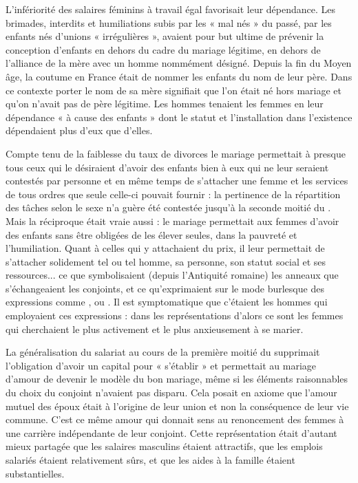 L'infériorité des salaires féminins à travail égal favorisait leur dépendance. Les brimades, interdits et humiliations subis par les « mal nés » du passé, par les enfants nés d'unions « irrégulières »,  avaient pour but ultime de prévenir la conception d'enfants en dehors du cadre du mariage légitime, en dehors de l'alliance de la mère avec un homme nommément désigné. Depuis la fin du Moyen âge, la coutume en France était de nommer les enfants du nom de leur père. Dans ce contexte porter le nom de sa mère signifiait que l'on était né hors mariage et qu'on n'avait pas de père légitime. Les hommes tenaient les femmes en leur dépendance « à cause des enfants » dont le statut et l'installation dans l'existence dépendaient plus d'eux que d'elles. 

Compte tenu de la faiblesse du taux de divorces le mariage permettait à presque tous ceux qui le désiraient d'avoir des enfants bien à eux qui ne leur seraient contestés par personne et en même temps de s'attacher une femme et les services de tous ordres que seule celle-ci pouvait fournir : la pertinence de la répartition des tâches selon le sexe n'a guère été contestée jusqu'à la seconde moitié du . Mais la réciproque était vraie aussi : le mariage permettait aux femmes d'avoir des enfants sans être obligées de les élever seules, dans la pauvreté et l'humiliation. Quant à celles qui y attachaient du prix, il leur permettait de s'attacher solidement tel ou tel homme, sa personne, son statut social et ses ressources... ce que symbolisaient (depuis l'Antiquité romaine) les anneaux que s'échangeaient les conjoints, et ce qu'exprimaient sur le mode burlesque des expressions comme , ou . Il est symptomatique que c'étaient les hommes qui employaient ces expressions : dans les représentations d'alors ce sont les femmes qui cherchaient le plus activement et le plus anxieusement à se marier.


 La généralisation du salariat au cours de la première moitié du  supprimait l'obligation d'avoir un capital pour « s'établir » et permettait au mariage d'amour de devenir le modèle du bon mariage, même si les éléments raisonnables du choix du conjoint n'avaient pas disparu. Cela posait en axiome que l'amour mutuel des époux était à l'origine de leur union et non la conséquence de leur vie commune. C'est ce même amour qui donnait sens au renoncement des femmes à une carrière indépendante de leur conjoint. Cette représentation était d'autant mieux  partagée que les salaires masculins étaient attractifs, que les emplois salariés étaient relativement sûrs, et que les aides à la famille étaient substantielles.
 
